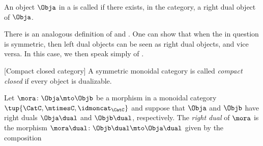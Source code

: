 \begin{definition}\label{def:right-dualizable}
    An object $\Obja$ in a  is called  if there exists, in the category, a right dual object of $\Obja$.
\end{definition}

\begin{remark}\label{rem:left-dualizability}
    There is an analogous definition of  and .
    One can show that when the  in question is symmetric, then left dual objects can be seen as right dual objects, and vice versa.
    In this case, we then speak simply of .
\end{remark}

\begin{ctdefinition}\label{def:compact-closed-category}[Compact closed category]
    A symmetric monoidal category is called \emph{compact closed} if every object is dualizable.
\end{ctdefinition}


\begin{ctdefinition}\label{def:dual-morphism}
    Let $\mora \colon \Obja \mto \Objb$ be a morphism in a monoidal category $\tup{\CatC,\mtimesC,\idmoncat_{\CatC}}$ and suppose that $\Obja$ and $\Objb$ have right duals $\Obja\dual$ and $\Objb\dual$, respectively.
    The \emph{right dual} of $\mora$ is the morphism $\mora\dual \colon \Objb\dual \mto \Obja\dual$ given by the composition
\end{ctdefinition}